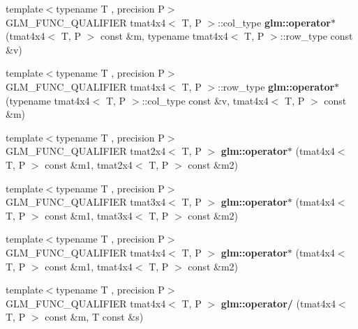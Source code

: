 \begin{DoxyCompactItemize}
{\footnotesize template$<$typename T , precision P$>$ }\\G\+L\+M\+\_\+\+F\+U\+N\+C\+\_\+\+Q\+U\+A\+L\+I\+F\+I\+ER tmat4x4$<$ T, P $>$\+::col\+\_\+type {\bfseries glm\+::operator$\ast$} (tmat4x4$<$ T, P $>$ const \&m, typename tmat4x4$<$ T, P $>$\+::row\+\_\+type const \&v)
\item 
\mbox{\label{type__mat4x4_8inl_a03183ab7d846537945d1022a78f6a34f}} 
{\footnotesize template$<$typename T , precision P$>$ }\\G\+L\+M\+\_\+\+F\+U\+N\+C\+\_\+\+Q\+U\+A\+L\+I\+F\+I\+ER tmat4x4$<$ T, P $>$\+::row\+\_\+type {\bfseries glm\+::operator$\ast$} (typename tmat4x4$<$ T, P $>$\+::col\+\_\+type const \&v, tmat4x4$<$ T, P $>$ const \&m)
\item 
\mbox{\label{type__mat4x4_8inl_a90a5edbd0b42811831af06c6aacd4a8e}} 
{\footnotesize template$<$typename T , precision P$>$ }\\G\+L\+M\+\_\+\+F\+U\+N\+C\+\_\+\+Q\+U\+A\+L\+I\+F\+I\+ER tmat2x4$<$ T, P $>$ {\bfseries glm\+::operator$\ast$} (tmat4x4$<$ T, P $>$ const \&m1, tmat2x4$<$ T, P $>$ const \&m2)
\item 
\mbox{\label{type__mat4x4_8inl_a1c04f769e6bde60bd80b3173b519b741}} 
{\footnotesize template$<$typename T , precision P$>$ }\\G\+L\+M\+\_\+\+F\+U\+N\+C\+\_\+\+Q\+U\+A\+L\+I\+F\+I\+ER tmat3x4$<$ T, P $>$ {\bfseries glm\+::operator$\ast$} (tmat4x4$<$ T, P $>$ const \&m1, tmat3x4$<$ T, P $>$ const \&m2)
\item 
\mbox{\label{type__mat4x4_8inl_a6dd36bf40e677eefd6f3e2acf88a2cf6}} 
{\footnotesize template$<$typename T , precision P$>$ }\\G\+L\+M\+\_\+\+F\+U\+N\+C\+\_\+\+Q\+U\+A\+L\+I\+F\+I\+ER tmat4x4$<$ T, P $>$ {\bfseries glm\+::operator$\ast$} (tmat4x4$<$ T, P $>$ const \&m1, tmat4x4$<$ T, P $>$ const \&m2)
\item 
\mbox{\label{type__mat4x4_8inl_ae255ad250d33a8cfb077044ce0950c27}} 
{\footnotesize template$<$typename T , precision P$>$ }\\G\+L\+M\+\_\+\+F\+U\+N\+C\+\_\+\+Q\+U\+A\+L\+I\+F\+I\+ER tmat4x4$<$ T, P $>$ {\bfseries glm\+::operator/} (tmat4x4$<$ T, P $>$ const \&m, T const \&s)
\item 

\end{DoxyCompactItemize}
